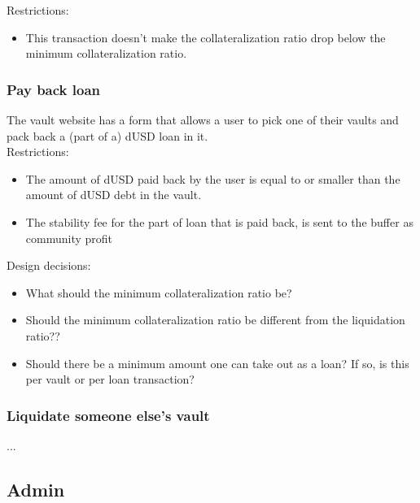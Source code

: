 \documentclass{article} %
\begin{document}
Restrictions:
\begin{itemize}
  \item This transaction doesn't make the collateralization ratio drop below the
    minimum collateralization ratio.
\end{itemize}


\subsubsection{Pay back loan}

The vault website has a form that allows a user to pick one of their vaults and
pack back a (part of a) dUSD loan in it. \\

Restrictions:
\begin{itemize}
  \item The amount of dUSD paid back by the user is equal to or smaller than the
    amount of dUSD debt in the vault.
  \item The stability fee for the part of loan that is paid back, is sent to the
    buffer as community profit
\end{itemize}

Design decisions:
\begin{itemize}
  \item What should the minimum collateralization ratio be?
  \item Should the minimum collateralization ratio be different from the
    liquidation ratio??
  \item Should there be a minimum amount one can take out as a loan? If so, is
    this per vault or per loan transaction?
\end{itemize}

\subsubsection{Liquidate someone else's vault}

...

\subsection{Admin}
\end{document}
